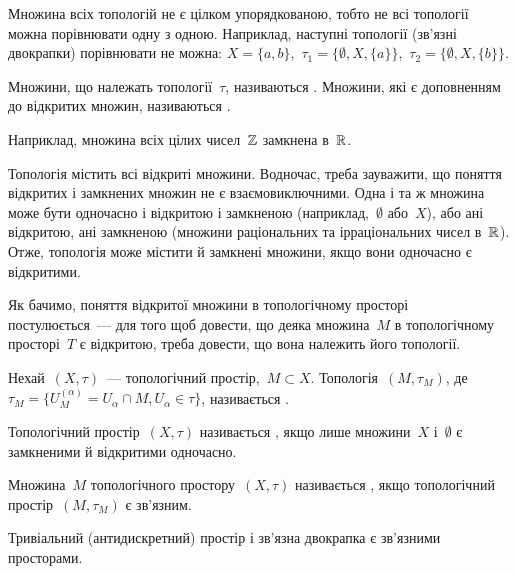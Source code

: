 \begin{remark}
    Множина всіх топологій не є цілком упорядкованою, тобто не всі топології можна порівнювати одну з одною. Наприклад, наступні топології (зв'язні двокрапки) порівнювати не можна: $X = \{a, b\}$,~$\tau_1 = \{\emptyset, X, \{a\}\}$,~$\tau_2 = \{\emptyset, X, \{b\}\}$.
\end{remark}

\begin{definition}
    Множини, що належать топології~$\tau$, називаються . Множини, які є доповненням до відкритих множин, називаються .
\end{definition}

Наприклад, множина всіх цілих чисел~$\mathbb{Z}$ замкнена в~$\mathbb{R}$.

\begin{remark}
    Топологія містить всі відкриті множини. Водночас, треба зауважити, що поняття відкритих і замкнених множин не є взаємовиключними. Одна і та ж множина може бути одночасно і відкритою і замкненою (наприклад,~$\emptyset$ або~$X$), або ані відкритою, ані замкненою (множини раціональних та ірраціональних чисел в~$\mathbb{R}$). Отже, топологія може містити й замкнені множини, якщо вони одночасно є відкритими.
\end{remark}

Як бачимо, поняття відкритої множини в топологічному просторі постулюється~--- для того щоб довести, що деяка множина~$M$ в топологічному просторі~$T$ є відкритою, треба довести, що вона належить його топології.

\begin{definition}
    Нехай~$(X, \tau)$~--- топологічний простір,~$M \subset X$. Топологія~$(M, \tau_M)$, де~$\tau_M = \{ U_M^{(\alpha)} = U_\alpha \cap M, U_\alpha \in \tau\}$, називається .
\end{definition}

\begin{definition}
    Топологічний простір~$(X, \tau)$ називається , якщо лише множини~$X$ і~$\emptyset$ є замкненими й відкритими одночасно.
\end{definition}

\begin{definition}
    Множина~$M$ топологічного простору~$(X, \tau)$ називається , якщо топологічний простір~$(M, \tau_M)$ є зв'язним.
\end{definition}

\begin{example}
    Тривіальний (антидискретний) простір і зв'язна двокрапка є зв'яз\-ними просторами.
\end{example}

